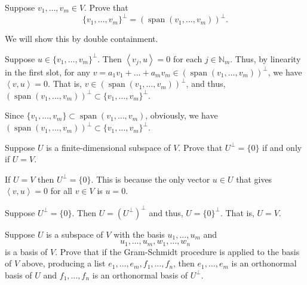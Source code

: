 \documentclass[12 pt, letterpaper]{hmcpset}
\begin{document}
\begin{problem}[1]
	Suppose $v_{1}, \dots, v_{m} \in V$. Prove that
	\[
		\{ v_{1}, \dots, v_{m} \}^{\perp} = (\operatorname{span}(v_{1}, \dots, v_{m}))^\perp.
	\]
\end{problem}

\begin{solution}
	We will show this by double containment.

	Suppose  $u \in \{ v_{1}, \dots, v_{m} \}^{\perp}$. Then $\left < v_{j}, u \right > = 0$ for each $j \in \mathbb{N}_{m}$. Thus, by linearity in the first slot, for any $v = a_{1} v_{1} + \dots + a_m v_{m} \in (\operatorname{span}(v_{1}, \dots, v_{m}))^{\perp}$, we have $\left < v, u \right > = 0$. That is, $v \in (\operatorname{span}(v_{1}, \dots, v_{m}))^{\perp}$, and thus, $(\operatorname{span}(v_{1}, \dots, v_{m}))^{\perp} \subset \{ v_{1}, \dots, v_{m} \}^{\perp}$.

	Since $\{ v_{1}, \dots, v_{m} \} \subset \operatorname{span}(v_{1}, \dots, v_{m})$, obviously, we have $(\operatorname{span}(v_{1}, \dots, v_{m}))^{\perp} \subset \{ v_{1}, \dots, v_{m} \}^{\perp}$.
\end{solution}

\pagebreak

\begin{problem}[2]
	Suppose $U$ is a finite-dimensional subspace of $V$. Prove that $U^{\perp} = \{ 0 \}$ if and only if $U = V$.
\end{problem}

\begin{solution}
	If $U = V$ then $U^{\perp} = \{ 0 \}$. This is because the only vector $u \in U$ that gives $\left < v, u \right > = 0$ for all $v \in V$ is $u = 0$.

	Suppose $U^{\perp} = \{ 0 \}$. Then $U = (U^{\perp})^{\perp}$ and thus, $U = \{ 0 \}^{\perp}$. That is, $U = V$.
\end{solution}

\pagebreak

\begin{problem}[3]
	Suppose $U$ is a subspace of $V$ with the basis $u_{1}, \dots, u_{m}$ and
	\[
		u_{1}, \dots, u_{m}, w_{1}, \dots, w_{n}
	\]
	is a basis of $V$. Prove that if the Gram-Schmidt procedure is applied to the basis of $V$ above, producing a list $e_{1}, \dots, e_{m}, f_{1}, \dots, f_{n}$, then $e_{1}, \dots, e_{m}$ is an orthonormal basis of $U$ and $f_{1}, \dots, f_{n}$ is an orthonormal basis of $U^{\perp}$.
\end{problem}
\end{document}
